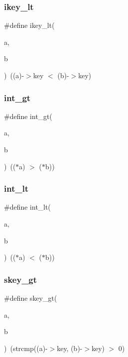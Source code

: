 \subsubsection{\texorpdfstring{ikey\+\_\+lt}{ikey\_lt}\hspace{0.1cm}{\footnotesize\ttfamily [3/3]}}
{\footnotesize\ttfamily \#define ikey\+\_\+lt(\begin{DoxyParamCaption}\item[{}]{a,  }\item[{}]{b }\end{DoxyParamCaption})~((a)-\/$>$key $<$ (b)-\/$>$key)}

\mbox{\label{a00140_abee37b0c8637f6fd1ae80712c6e41357}} 
\subsubsection{\texorpdfstring{int\+\_\+gt}{int\_gt}}
{\footnotesize\ttfamily \#define int\+\_\+gt(\begin{DoxyParamCaption}\item[{}]{a,  }\item[{}]{b }\end{DoxyParamCaption})~(($\ast$a) $>$ ($\ast$b))}

\mbox{\label{a00140_af736e6a33cbb2a23c451f40c9a0f7654}} 
\subsubsection{\texorpdfstring{int\+\_\+lt}{int\_lt}}
{\footnotesize\ttfamily \#define int\+\_\+lt(\begin{DoxyParamCaption}\item[{}]{a,  }\item[{}]{b }\end{DoxyParamCaption})~(($\ast$a) $<$ ($\ast$b))}

\mbox{\label{a00140_ab04d2c8592e14ea6c17053d48b2fab9d}} 
\subsubsection{\texorpdfstring{skey\+\_\+gt}{skey\_gt}}
{\footnotesize\ttfamily \#define skey\+\_\+gt(\begin{DoxyParamCaption}\item[{}]{a,  }\item[{}]{b }\end{DoxyParamCaption})~(strcmp((a)-\/$>$key, (b)-\/$>$key) $>$ 0)}

